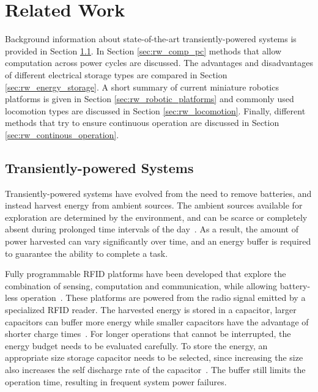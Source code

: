 \chapter{Related Work}
\label{chp:related_work}

Background information about state-of-the-art transiently-powered systems is provided in Section \ref{sec:rw_tp_systems}.
In Section \ref{sec:rw_comp_pc} methods that allow computation across power cycles are discussed.
The advantages and disadvantages of different electrical storage types are compared in Section \ref{sec:rw_energy_storage}. 
A short summary of current miniature robotics platforms is given in Section \ref{sec:rw_robotic_platforms} and commonly used locomotion types are discussed in Section \ref{sec:rw_locomotion}. 
Finally, different methods that try to ensure continuous operation are discussed in Section \ref{sec:rw_continous_operation}.

\section{Transiently-powered Systems}
\label{sec:rw_tp_systems}

Transiently-powered systems have evolved from the need to remove batteries, and instead harvest energy from ambient sources.
The ambient sources available for exploration are determined by the environment, and can be scarce or completely absent during prolonged time intervals of the day~\cite{konstantopoulos_im_2016}.
As a result, the amount of power harvested can vary significantly over time, and an energy buffer is required to guarantee the ability to complete a task.

Fully programmable RFID platforms have been developed that explore the combination of sensing, computation and communication, while allowing battery-less operation~\cite{sample_transim_2008}.
These platforms are powered from the radio signal emitted by a specialized RFID reader. 
The harvested energy is stored in a capacitor, larger capacitors can buffer more energy while smaller capacitors have the advantage of shorter charge times~\cite{gummerson_mobisys_2010}.
For longer operations that cannot be interrupted, the energy budget needs to be evaluated carefully.
To store the energy, an appropriate size storage capacitor needs to be selected, since increasing the size also increases the self discharge rate of the capacitor~\cite{naderiparizi_rfid_2015}.
The buffer still limits the operation time, resulting in frequent system power failures.

